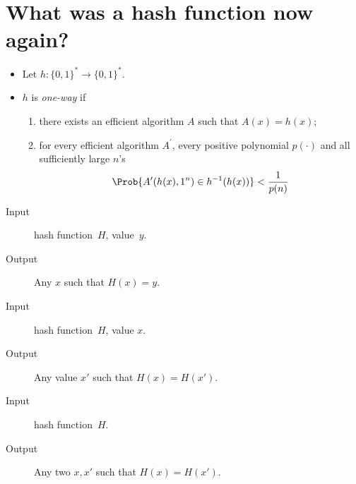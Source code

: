 \mode*

\section[Hash functions]{What was a hash function now again?}

\begin{frame}
  \begin{definition}
    \begin{itemize}
      \item Let \(h\colon \{0,1\}^*\to \{0,1\}^*\).
      \item \(h\) is \emph{one-way} if
        \begin{enumerate}
          \item there exists an efficient algorithm \(A\) such that \(A(x) 
              = h(x)\);
          \item for every efficient algorithm \(A^\prime\), every positive 
            polynomial \(p(\cdot)\) and all sufficiently large \(n\)'s
            \[\Prob{A^\prime(h(x), 1^n) \in h^{-1}(h(x))} < \frac{1}{p(n)}\]
        \end{enumerate}
    \end{itemize}
  \end{definition}
\end{frame}

\begin{frame}
  \begin{definition}
    \begin{description}
      \item[Input] hash function~\(H\), value~\(y\).
      \item[Output] Any \(x\) such that \(H(x) = y\).
    \end{description}
  \end{definition}

  \begin{definition}
    \begin{description}
      \item[Input] hash function~\(H\), value \(x\).
      \item[Output] Any value \(x'\) such that \(H(x) = H(x')\).
    \end{description}
  \end{definition}

  \begin{definition}
    \begin{description}
      \item[Input] hash function~\(H\).
      \item[Output] Any two \(x, x'\) such that \(H(x) = H(x')\).
    \end{description}
  \end{definition}
\end{frame}


